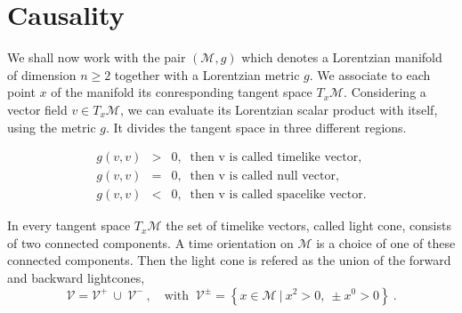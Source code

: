 \documentclass[10pt]{book}
\newcommand{\Mcal}{\mathcal{M}}
\newcommand{\Vcal}{\mathcal{V}}
\theoremstyle{break}
\begin{document}
\section{Causality}


We shall now work with the pair $(\Mcal,g)$ which denotes a Lorentzian manifold of dimension $n \geq 2$ together with a Lorentzian metric $g$. We associate to each point $x$ of the manifold its conresponding tangent space $T_x\Mcal$. Considering a vector field $v \in T_x\Mcal$, we can evaluate its Lorentzian scalar product with itself, using the metric $g$. It divides the tangent space in three different regions.


\begin{eqnarray*}
g(v,v) &>& 0 , \ \mbox{ then v is called timelike vector}, \\ 
g(v,v) &=& 0 , \ \mbox{ then v is called null vector}, \\ 
g(v,v) &<& 0 , \ \mbox{ then v is called spacelike vector}.
\end{eqnarray*}


In every tangent space $T_x\Mcal$ the set of timelike vectors, called light cone, consists of two connected components. A time orientation on $\Mcal$ is a choice of one of these connected components. Then the light cone is refered as the union of the forward and backward lightcones, 
%
\begin{equation*}
\Vcal=\Vcal^{+} \ \cup \ \Vcal^{-} \ , \quad \mbox{with } \ \Vcal^{\pm}=\left\{ x\in\Mcal \ | \ x^{2}>0, \ \pm x^{0}>0 \right\} \ . 
\end{equation*}


%
%
%
%
%
%
%
\end{document}
